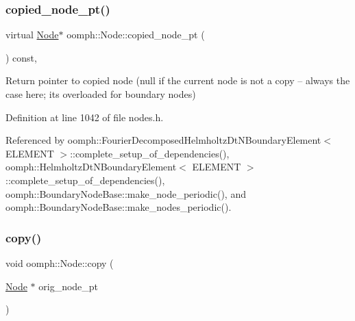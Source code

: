 \mbox{\label{classoomph_1_1Node_acbb3364ba340290a61dfe17ad16c5695}} 
\subsubsection{\texorpdfstring{copied\+\_\+node\+\_\+pt()}{copied\_node\_pt()}}
{\footnotesize\ttfamily virtual \hyperlink{classoomph_1_1Node}{Node}$\ast$ oomph\+::\+Node\+::copied\+\_\+node\+\_\+pt (\begin{DoxyParamCaption}{ }\end{DoxyParamCaption}) const\hspace{0.3cm}{\ttfamily [inline]}, {\ttfamily [virtual]}}



Return pointer to copied node (null if the current node is not a copy -- always the case here; it\textquotesingle{}s overloaded for boundary nodes) 



Definition at line 1042 of file nodes.\+h.



Referenced by oomph\+::\+Fourier\+Decomposed\+Helmholtz\+Dt\+N\+Boundary\+Element$<$ E\+L\+E\+M\+E\+N\+T $>$\+::complete\+\_\+setup\+\_\+of\+\_\+dependencies(), oomph\+::\+Helmholtz\+Dt\+N\+Boundary\+Element$<$ E\+L\+E\+M\+E\+N\+T $>$\+::complete\+\_\+setup\+\_\+of\+\_\+dependencies(), oomph\+::\+Boundary\+Node\+Base\+::make\+\_\+node\+\_\+periodic(), and oomph\+::\+Boundary\+Node\+Base\+::make\+\_\+nodes\+\_\+periodic().

\mbox{\label{classoomph_1_1Node_a103b12afe541e9bbe5c0790c1c0efe55}} 
\subsubsection{\texorpdfstring{copy()}{copy()}}
{\footnotesize\ttfamily void oomph\+::\+Node\+::copy (\begin{DoxyParamCaption}\item[{\hyperlink{classoomph_1_1Node}{Node} $\ast$}]{orig\+\_\+node\+\_\+pt }\end{DoxyParamCaption})}



